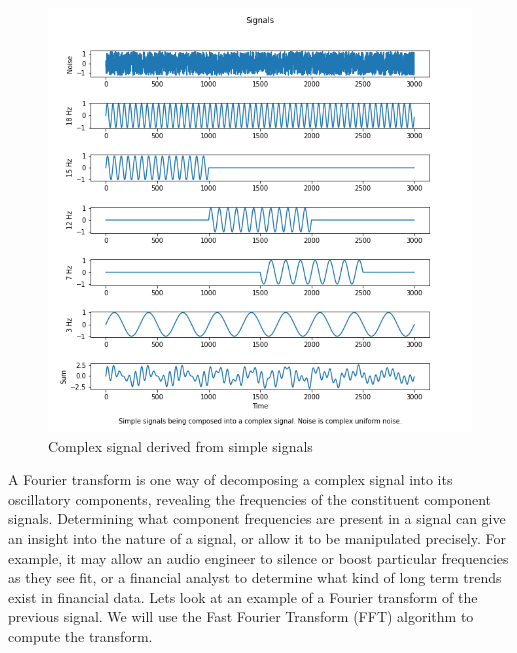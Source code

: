\documentclass[
  english,
  paper=a4,
  oneside  ,captions=tableheading
]{scrbook}
\begin{document}
\begin{figure}
\centering
\includegraphics{img/composite_signal.png}
\caption{Complex signal derived from simple signals}
\end{figure}

A Fourier transform is one way of decomposing a complex signal into its
oscillatory components, revealing the frequencies of the constituent
component signals. Determining what component frequencies are present in
a signal can give an insight into the nature of a signal, or allow it to
be manipulated precisely. For example, it may allow an audio engineer to
silence or boost particular frequencies as they see fit, or a financial
analyst to determine what kind of long term trends exist in financial
data. Lets look at an example of a Fourier transform of the previous
signal. We will use the Fast Fourier Transform (FFT) algorithm to
compute the transform.
\end{document}
